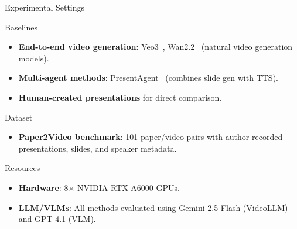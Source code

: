 \documentclass{beamer}
\newcommand{\alertterm}[1]{\alert{\textbf{#1}}}
\begin{document}
\begin{frame}{Experimental Settings}
  \begin{block}{\small Baselines}
    \small
    \begin{itemize}
      \item \alertterm{End-to-end video generation}: Veo3~\cite{deepmind2025veo3}, Wan2.2~\cite{wan} (natural video generation models).
      \item \alertterm{Multi-agent methods}: PresentAgent~\cite{shi2025presentagent} (combines slide gen with TTS).
      \item \alertterm{Human-created presentations} for direct comparison.
    \end{itemize}
  \end{block}
  \vspace{-0.5\baselineskip}
  \begin{block}{\small Dataset}
    \small
    \begin{itemize}
      \item \alertterm{Paper2Video benchmark}: 101 paper/video pairs with author-recorded presentations, slides, and speaker metadata.
    \end{itemize}
  \end{block}
  \vspace{-0.5\baselineskip}
  \begin{block}{\small Resources}
    \small
    \begin{itemize}
      \item \alertterm{Hardware}: 8$\times$ NVIDIA RTX A6000 GPUs.
      \item \alertterm{LLM/VLMs}: All methods evaluated using Gemini-2.5-Flash (VideoLLM) and GPT-4.1 (VLM).
    \end{itemize}
  \end{block}
\end{frame}
\end{document}
